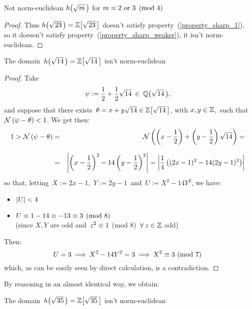 \begin{subsection}{Not norm-euclidean $\hh{m}$ for %
                   $m \equiv 2 \text{ or } 3 \pmod 4$}
\begin{proof}
Thus $\hh{23} = \ZZ{23}$ doesn't satisfy
property~(\ref{property_sharp_1}), so it doesen't satisfy
property~(\ref{property_sharp_weaker}), \ie it isn't
norm-euclidean.
%
\end{proof}

\begin{thm}\label{h(sqrt(14)) not norm-euclidean}
The domain\, $\hh{14} = \ZZ{14}$ isn't norm-euclidean
\end{thm}

\begin{proof}
%
Take
$$ \psi:= \frac{1}{2} + \frac{1}{2} \sqrt{14} \:\in\: \QQ{14}, $$
and suppose that there exists\,
$\theta = x + y\sqrt{14} \in \ZZ{14}$, with $x, y\in\mathbb{Z}$,
\,such that\, $\mathcal{N}\left(\psi - \theta\right) < 1$.
We get then:
%
\begin{eqnarray*}
1 > \mathcal{N}\left(\psi - \theta\right) & = &
\mathcal{N}\left(\left(x - \frac{1}{2}\right) +
\left(y - \frac{1}{2}\right)\sqrt{14}\right) = \\[7pt]
& = & \left|\left(x - \frac{1}{2}\right)^2
- 14\left(y - \frac{1}{2}\right)^2\right| =
\left|\frac{1}{4}\left((2x - 1)^2 - 14(2y - 1)^2\right)\right|
\end{eqnarray*}
%
so that, letting\, $X:= 2x - 1$,\, $Y:= 2y - 1$\,
and\, $U:= X^2 - 14Y^2$, we have:
\begin{itemize}

\item $\left|U\right| < 4$

\item $U \equiv 1 - 14 \equiv -13 \equiv 3 \pmod 8$\\
(since $X,Y$ are odd and\, $z^2 \equiv 1$
(mod $8$)\, $\forall\: z \in \mathbb{Z}$ odd)

\end{itemize}

Then:
$$
U = 3 \:\Longrightarrow\: X^2 - 14Y^2 = 3 \:\Longrightarrow\:
X^2 \equiv 3\ (\mathrm{mod}\ 7)
$$
%
which, as can be easily seen by direct calculation, is a contradiction.
\end{proof}

By reasoning in an almost identical way, we obtain:

\begin{thm}\label{h(sqrt(35)) not norm-euclidean}
The domain\, $\hh{35} = \ZZ{35}$ isn't norm-euclidean
\end{thm}


\end{subsection}
